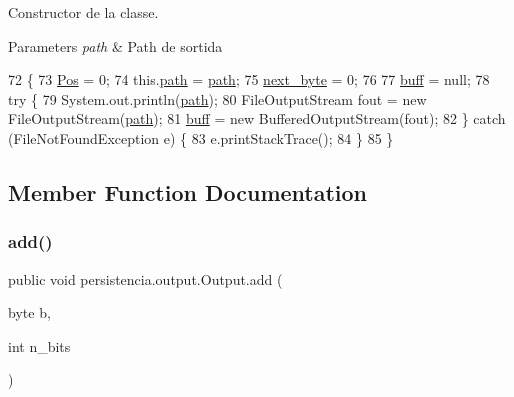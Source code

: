 Constructor de la classe. 


\begin{DoxyParams}{Parameters}
{\em path} & Path de sortida \\
\hline
\end{DoxyParams}

\begin{DoxyCode}
72                                 \{
73         \hyperlink{classpersistencia_1_1output_1_1Output_a3709182600423f7e57644ccdd0016f22}{Pos} = 0;
74         this.\hyperlink{classpersistencia_1_1output_1_1Output_aebef717882f3bcc7080dec014c6714c9}{path} = \hyperlink{classpersistencia_1_1output_1_1Output_aebef717882f3bcc7080dec014c6714c9}{path};
75         \hyperlink{classpersistencia_1_1output_1_1Output_aca83082ef84ec2e169b6fa34618d0773}{next\_byte} = 0;
76 
77         \hyperlink{classpersistencia_1_1output_1_1Output_ae8f22fd92b020c318f6f377cf3ac39de}{buff} = null;
78         \textcolor{keywordflow}{try} \{
79             System.out.println(\hyperlink{classpersistencia_1_1output_1_1Output_aebef717882f3bcc7080dec014c6714c9}{path});
80             FileOutputStream fout = \textcolor{keyword}{new} FileOutputStream(\hyperlink{classpersistencia_1_1output_1_1Output_aebef717882f3bcc7080dec014c6714c9}{path});
81             \hyperlink{classpersistencia_1_1output_1_1Output_ae8f22fd92b020c318f6f377cf3ac39de}{buff} = \textcolor{keyword}{new} BufferedOutputStream(fout);
82         \} \textcolor{keywordflow}{catch} (FileNotFoundException e) \{
83             e.printStackTrace();
84         \}
85     \}
\end{DoxyCode}


\subsection{Member Function Documentation}
\mbox{\label{classpersistencia_1_1output_1_1Output_adc03a0dd7a94da21fe8432064a4eec09}} 
\subsubsection{\texorpdfstring{add()}{add()}}
{\footnotesize\ttfamily public void persistencia.\+output.\+Output.\+add (\begin{DoxyParamCaption}\item[{byte}]{b,  }\item[{int}]{n\+\_\+bits }\end{DoxyParamCaption})\hspace{0.3cm}{\ttfamily [inline]}}



